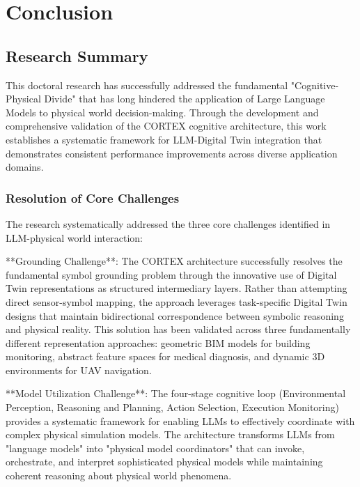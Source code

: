 
\chapter{Conclusion} \label{chp:conclusion}


\section{Research Summary}

This doctoral research has successfully addressed the fundamental "Cognitive-Physical Divide" that has long hindered the application of Large Language Models to physical world decision-making. Through the development and comprehensive validation of the CORTEX cognitive architecture, this work establishes a systematic framework for LLM-Digital Twin integration that demonstrates consistent performance improvements across diverse application domains.

\subsection{Resolution of Core Challenges}

The research systematically addressed the three core challenges identified in LLM-physical world interaction:

**Grounding Challenge**: The CORTEX architecture successfully resolves the fundamental symbol grounding problem through the innovative use of Digital Twin representations as structured intermediary layers. Rather than attempting direct sensor-symbol mapping, the approach leverages task-specific Digital Twin designs that maintain bidirectional correspondence between symbolic reasoning and physical reality. This solution has been validated across three fundamentally different representation approaches: geometric BIM models for building monitoring, abstract feature spaces for medical diagnosis, and dynamic 3D environments for UAV navigation.

**Model Utilization Challenge**: The four-stage cognitive loop (Environmental Perception, Reasoning and Planning, Action Selection, Execution Monitoring) provides a systematic framework for enabling LLMs to effectively coordinate with complex physical simulation models. The architecture transforms LLMs from "language models" into "physical model coordinators" that can invoke, orchestrate, and interpret sophisticated physical models while maintaining coherent reasoning about physical world phenomena.

